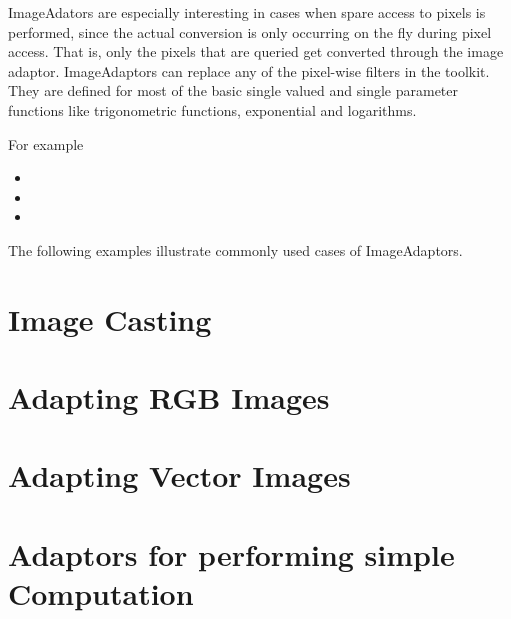 ImageAdators are especially interesting in cases when spare access to pixels is
performed, since the actual conversion is only occurring on the fly during
pixel access. That is, only the pixels that are queried get converted through
the image adaptor.  ImageAdaptors can replace any of the pixel-wise filters in
the toolkit. They are defined for most of the basic single valued and single
parameter functions like trigonometric functions, exponential and logarithms.

For example

\begin{itemize}
\item {}
\item {}
\item {}
\end{itemize}

The following examples illustrate commonly used cases of ImageAdaptors.

\section{Image Casting}
\label{sec:ImageAdaptorForBasicCasting}
\ifitkFullVersion

\fi

\section{Adapting RGB Images}
\label{sec:ImageAdaptorForRGB}
\ifitkFullVersion

\fi


\section{Adapting Vector Images}
\label{sec:ImageAdaptorForVectors}
\ifitkFullVersion

\fi

\section{Adaptors for performing simple Computation}
\label{sec:ImageAdaptorForSimpleComputation}
\ifitkFullVersion

\fi



